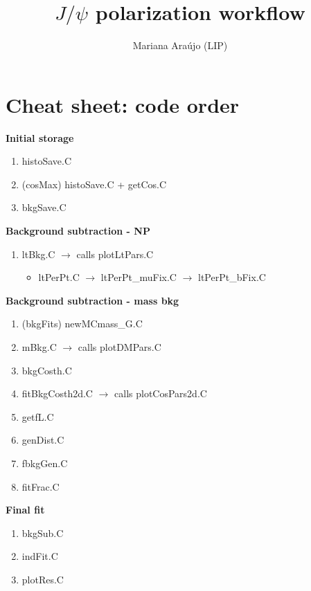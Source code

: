 \documentclass{article}
\begin{document}
\title{$J/\psi$ polarization workflow }
\author{Mariana Ara\'ujo (LIP)}
\maketitle

\tableofcontents

\pagebreak

\section{Cheat sheet: code order}


\textbf{Initial storage}
\begin{enumerate}
\item histoSave.C
\item (cosMax) histoSave.C + getCos.C
\item bkgSave.C
\end{enumerate}

\textbf{Background subtraction - NP}
\begin{enumerate}
\item ltBkg.C $\rightarrow$ calls plotLtPars.C
\begin{itemize}
\item ltPerPt.C $\rightarrow$ ltPerPt\_muFix.C $\rightarrow$ ltPerPt\_bFix.C
\end{itemize}
\end{enumerate}

\textbf{Background subtraction - mass bkg}
\begin{enumerate}
\item (bkgFits) newMCmass\_G.C
\item mBkg.C $\rightarrow$ calls plotDMPars.C
\item bkgCosth.C
\item fitBkgCosth2d.C $\rightarrow$ calls plotCosPars2d.C
\item getfL.C
\item genDist.C
\item fbkgGen.C
\item fitFrac.C
\end{enumerate}

\textbf{Final fit}
\begin{enumerate}
\item bkgSub.C
\item indFit.C
\item plotRes.C
\end{enumerate}

\pagebreak
\end{document}
